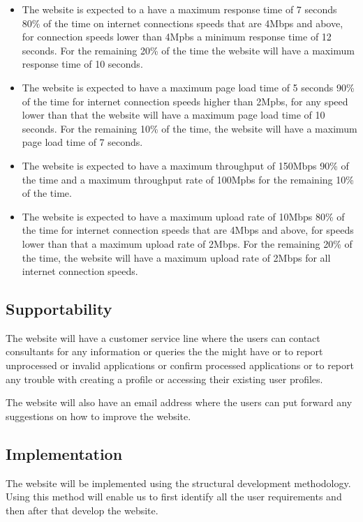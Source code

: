 \documentclass[a4paper, 12pt]{article}
\begin{document}
\begin{itemize}
\item The website is expected to a have a maximum response time of 7 seconds 80\% of the time on internet connections speeds that are 4Mbps and above, for connection speeds lower than 4Mpbs a minimum response time of 12 seconds. For the remaining 20\% of the time the website will have a maximum response time of 10 seconds.
\item The website is expected to have a maximum page load time of 5 seconds 90\% of the time for internet connection speeds higher than 2Mpbs, for any speed lower than that the website will have a maximum page load time of 10 seconds. For the remaining 10\% of the time, the website will have a maximum page load time of 7 seconds.
\item The website is expected to have a maximum throughput of 150Mbps 90\% of the time and a maximum throughput rate of 100Mpbs for the remaining 10\% of the time.
\item The website is expected to have a maximum upload rate of 10Mbps 80\% of the time for internet connection speeds that are 4Mbps and above, for speeds lower than that a maximum upload rate of 2Mbps. For the remaining 20\% of the time, the website will have a maximum upload rate of 2Mbps for all internet connection speeds. 
\end{itemize}


\subsection{Supportability}

The website will have a customer service line where the users can contact consultants for any information or queries the the might have or to report unprocessed or invalid applications or confirm processed applications or to report any trouble with creating a profile or accessing their existing user profiles.

The website will also have an email address where the users can put forward any suggestions on how to improve the website.

\subsection{Implementation}

The website will be implemented using the structural development methodology. Using this method will enable us to first identify all the user requirements and then after that develop the website.
\end{document}
